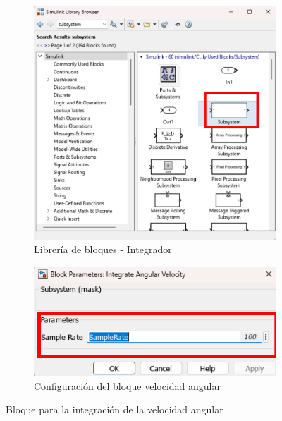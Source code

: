 \begin{figure}[htbp]
    \centering
    \begin{subfigure}[b]{0.35\textwidth}
        \centering
        \includegraphics[width=\textwidth]{fig/Capitulo5/Caso_de_estudio_IMU/Generador_de_archivos/libreria_de_bloques_subsistema_integracion_velocidad_angular.pdf}
        \caption{Librería de bloques - Integrador}
        \label{fig:lib_bloques_integrador}
    \end{subfigure}
    \hfill
    \begin{subfigure}[b]{0.45\textwidth}
        \centering
        \includegraphics[width=\textwidth]{fig/Capitulo5/Caso_de_estudio_IMU/Generador_de_archivos/configuracion_integrador_velocidad_angular.pdf}
        \caption{Configuración del bloque velocidad angular}
        \label{fig:config_bloques_integrador}
    \end{subfigure}
    \caption{Bloque para la integración de la velocidad angular}
    \label{fig:integration_for_angular_velocity}
\end{figure}

